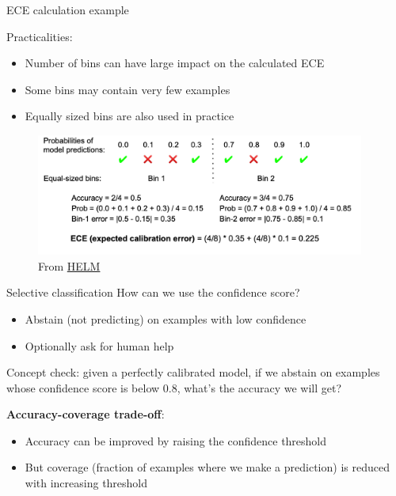 \documentclass[usenames,dvipsnames,notes,11pt,aspectratio=169,hyperref={colorlinks=true, linkcolor=blue}]{beamer}
\begin{document}
\begin{frame}
    {ECE calculation example}

    Practicalities:\\
    \begin{itemize}
        \item Number of bins can have large impact on the calculated ECE\pause
        \item Some bins may contain very few examples 
        \item Equally sized bins are also used in practice
    \end{itemize}

    \vspace{-1em}
    \begin{figure}
        \includegraphics[height=4cm]{figures/ece-calc}
        \caption{From \href{https://arxiv.org/pdf/2211.09110.pdf}{HELM}}
    \end{figure}
\end{frame}

\begin{frame}
    {Selective classification}
    How can we use the confidence score?\\
    \begin{itemize}
    \item Abstain (not predicting) on examples with low confidence
        \item Optionally ask for human help
    \end{itemize}

    \pause
    Concept check: given a perfectly calibrated model, if we abstain on examples whose confidence score is below 0.8, what's the accuracy we will get?

    \pause
    \textbf{Accuracy-coverage trade-off}:\\
    \begin{itemize}
    \item Accuracy can be improved by raising the confidence threshold
    \item But coverage (fraction of examples where we make a prediction) is reduced with increasing threshold
    \end{itemize}
\end{frame}
\end{document}
